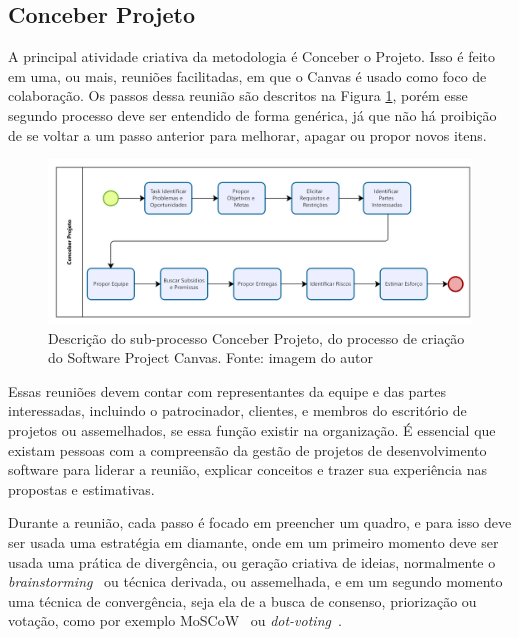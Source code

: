 \documentclass[fontsize=12pt, a4paper,pagesize=auto,toc=listof, ,twoside,chapterprefix=false,appendixprefix=true,open=right]{scrbook}
\begin{document}
\subsection{Conceber Projeto}

A principal atividade criativa da metodologia é Conceber o Projeto. Isso é feito em uma, ou mais, reuniões facilitadas, em que o Canvas é usado como foco de colaboração. Os passos dessa reunião são descritos na Figura \ref{fig:bpmn2}, porém esse segundo processo deve ser entendido de forma genérica, já que não há proibição de se voltar a um passo anterior para melhorar, apagar ou propor novos itens.

\begin{figure}[tbh]
\centering
\includegraphics[width=\textwidth]{"Modelos/Software Project Canvas BPMN Bizagi Conceber Projeto"}
\caption{Descrição do sub-processo Conceber Projeto, do processo de criação do Software Project Canvas. Fonte: imagem do autor}
\label{fig:bpmn2}
\end{figure}


Essas reuniões devem contar com representantes da equipe e das partes interessadas, incluindo o patrocinador, clientes, e membros do escritório de projetos ou assemelhados, se essa função existir na organização. É essencial que existam pessoas com a compreensão da gestão de projetos de desenvolvimento software para liderar a reunião, explicar conceitos e trazer sua experiência nas propostas e estimativas.

Durante a reunião, cada passo é focado em preencher um quadro, e para isso deve ser usada uma estratégia em diamante, onde em um primeiro momento deve ser usada uma prática de divergência, ou geração criativa de ideias, normalmente o \textit{brainstorming}~\citep{tracy:2015} ou técnica derivada, ou assemelhada, e em um segundo momento uma técnica de convergência,  seja ela de a busca de consenso, priorização ou votação, como por exemplo MoSCoW~\citep{dsdm:2nd} ou \textit{dot-voting}~\citep{gray:2010}.
\end{document}
